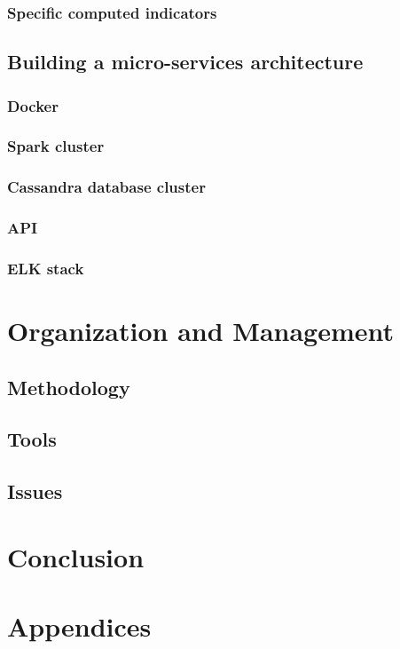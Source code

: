 \documentclass[11pt]{article}
\begin{document}
\subsubsection{Specific computed indicators}

\subsection{Building a micro-services architecture}


\subsubsection{Docker}

\subsubsection{Spark cluster}

\subsubsection{Cassandra database cluster}

\subsubsection{API}

\subsubsection{ELK stack}

\section{Organization and Management}

\subsection{Methodology}
\subsection{Tools}
\subsection{Issues}

\section{Conclusion}






\section{Appendices}
\end{document}
